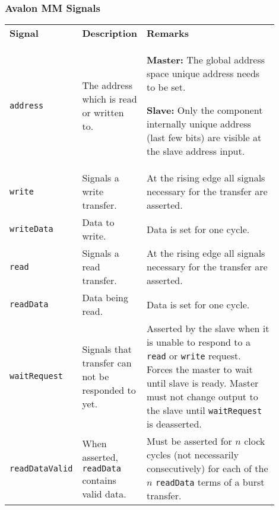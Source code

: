 		\subsubsection{Avalon MM Signals  }
			\begin{longtable}{|p{0.12\linewidth}||p{0.22\linewidth}|p{0.56\linewidth}|}					
				\hline
				\textbf{Signal}
					& \textbf{Description}
					& \textbf{Remarks}\\
				\hhline{|=#=|=|}
				\texttt{address}
					& The address which is read or written to. 
					&   \textbf{Master:} The global address space unique address needs to be set.
					
					  	\textbf{Slave:} Only the component internally unique address (last few bits) are visible at the slave address input.\\
				\hline
				\texttt{write}
					& Signals a write transfer.
					& At the rising edge all signals necessary for the transfer are asserted.\\
				\hline
				\texttt{writeData}
					& Data to write.
					& Data is set for one cycle.\\
				\hline
				\texttt{read}
					& Signals a read transfer.
					& At the rising edge all signals necessary for the transfer are asserted.\\
				\hline
				\texttt{readData}
					& Data being read.
					& Data is set for one cycle.\\
				\hline
				\texttt{waitRequest}
					& Signals that transfer can not be responded to yet.
					& Asserted by the slave when it is unable to respond to a \texttt{read} or \texttt{write} request. Forces the master to wait until slave is ready. Master must not change output to the slave until \texttt{waitRequest} is deasserted.\\
				\hline
				\texttt{readDataValid}
					& When asserted, \texttt{readData} contains valid data.
					& Must be asserted for $n$ clock cycles (not necessarily consecutively) for each of the $n$ \texttt{readData} terms of a burst transfer.\\
				\hline
			\end{longtable}	
		
